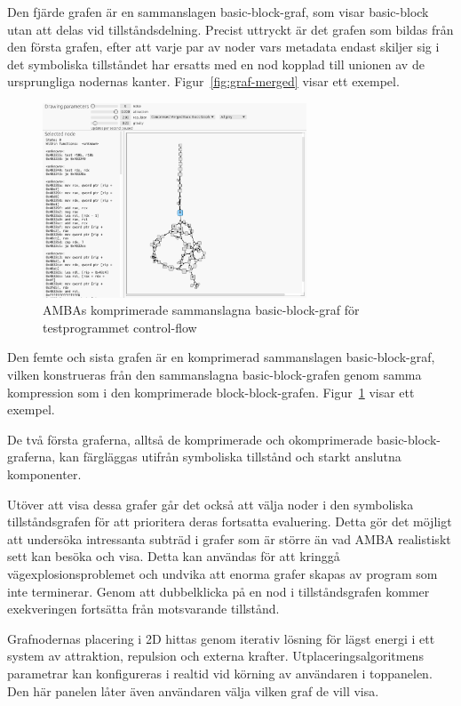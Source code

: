 Den fjärde grafen är en sammanslagen basic-block-graf, som visar basic-block
utan att delas vid tillståndsdelning. Precist uttryckt är det grafen som bildas
från den första grafen, efter att varje par av noder vars metadata endast
skiljer sig i det symboliska tillståndet har ersatts med en nod kopplad till unionen av
de ursprungliga nodernas kanter. Figur~\ref{fig:graf-merged} visar ett exempel.

\begin{figure}
    \centering
    \includegraphics[width=0.7\textwidth]{figures/graph_merged_compressed.png}
    \caption{
        AMBAs komprimerade sammanslagna basic-block-graf för testprogrammet control-flow
    }\label{fig:graf-merged-compressed}
\end{figure}

Den femte och sista grafen är en komprimerad sammanslagen basic-block-graf,
vilken konstrueras från den sammanslagna basic-block-grafen genom samma
kompression som i den komprimerade block-block-grafen.
Figur~\ref{fig:graf-merged-compressed} visar ett exempel.

De två första graferna, alltså de komprimerade och okomprimerade
basic-block-graferna, kan färgläggas utifrån symboliska tillstånd och starkt
anslutna komponenter.

Utöver att visa dessa grafer går det också att välja noder i den symboliska
tillståndsgrafen för att prioritera deras fortsatta evaluering. Detta gör det
möjligt att undersöka intressanta subträd i grafer som är större än vad AMBA
realistiskt sett kan besöka och visa. Detta kan användas för att kringgå
vägexplosionsproblemet och undvika att enorma grafer skapas av program som inte
terminerar. Genom att dubbelklicka på en nod i tillståndsgrafen kommer
exekveringen fortsätta från motsvarande tillstånd.

Grafnodernas placering i 2D hittas genom iterativ lösning för lägst energi i ett
system av attraktion, repulsion och externa krafter. Utplaceringsalgoritmens
parametrar kan konfigureras i realtid vid körning av användaren i toppanelen.
Den här panelen låter även användaren välja vilken graf de vill visa.

